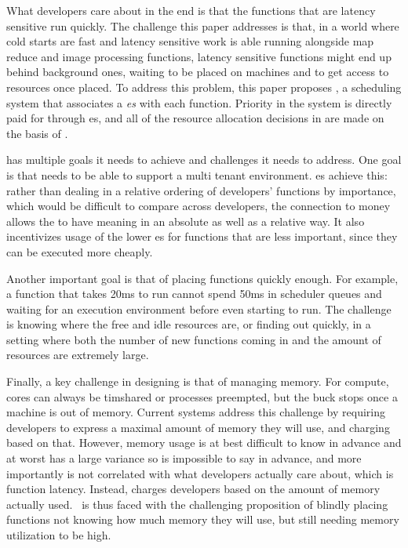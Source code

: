 What developers care about in the end is that the functions that are latency
sensitive run quickly. The challenge this paper addresses is that, in a world
where cold starts are fast and latency sensitive work is able running alongside
map reduce and image processing functions, latency sensitive functions might end
up behind background ones, waiting to be placed on machines and to get access to
resources once placed. To address this problem, this paper proposes \sys{}, a
scheduling system that associates a \textit{\priceclass{}es} with each function.
Priority in the system is directly paid for through \priceclass{}es, and all of
the resource allocation decisions in \sys{} are made on the basis of
\priceclass{}.

\Sys{} has multiple goals it needs to achieve and challenges it needs to
address. One goal is that \sys{} needs to be able to support a multi tenant
environment. \Priceclass{}es achieve this: rather than dealing in a relative
ordering of developers' functions by importance, which would be difficult to
compare across developers, the connection to money allows the \class{} to have
meaning in an absolute as well as a relative way. It also incentivizes usage of
the lower \class{}es for functions that are less important, since they can be
executed more cheaply.


Another important goal is that of placing functions quickly enough. For example,
a function that takes 20ms to run cannot spend 50ms in scheduler queues and
waiting for an execution environment before even starting to run. The challenge
is knowing where the free and idle resources are, or finding out quickly, in a
setting where both the number of new functions coming in and the amount of
resources are extremely large.


Finally, a key challenge in designing \sys{} is that of managing memory. For
compute, cores can always be timshared or processes preempted, but the buck
stops once a machine is out of memory. Current systems address this challenge by
requiring developers to express a maximal amount of memory they will use, and
charging based on that. However, memory usage is at best difficult to know in
advance and at worst has a large variance so is impossible to say in advance,
and more importantly is not correlated with what developers actually care about,
which is function latency. Instead, \sys{} charges developers based on the
amount of memory actually used.~\Sys{} is thus faced with the challenging
proposition of blindly placing functions not knowing how much memory they will
use, but still needing memory utilization to be high.
 
